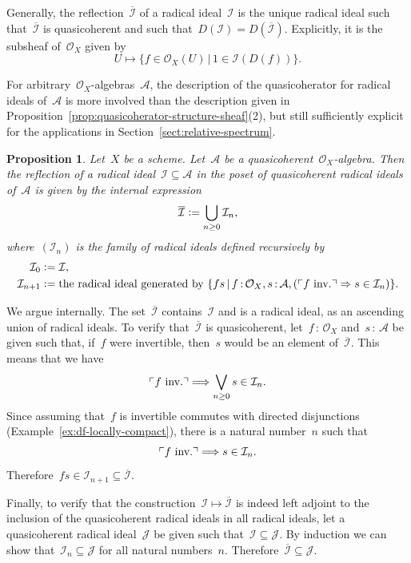 \documentclass[10pt,reqno,a4paper]{amsbook}
\makeatletter
\theoremstyle{definition}
\theoremstyle{plain}
\newtheorem{prop}[defn]{Proposition}
\theoremstyle{remark}
\newcommand{\A}{\mathcal{A}}
\renewcommand{\O}{\mathcal{O}}
\newcommand{\I}{\mathcal{I}}
\newcommand{\J}{\mathcal{J}}
\newcommand{\?}{\,{:}\,}
\renewcommand{\_}{\mathpunct{.}\,}
\newcommand{\speak}[1]{\ulcorner\text{\textnormal{#1}}\urcorner}
\newcommand{\inv}{inv.\@}
\newcommand{\defeq}{\vcentcolon=}
\renewenvironment{proof}[1][\proofname]{\par
  \pushQED{\qed}%
  \normalfont \topsep6\p@\@plus6\p@\relax
  \trivlist
  \item[\hskip\labelsep
        \itshape
    #1\@addpunct{.}]\ignorespaces
}{%
  \popQED\endtrivlist\@endpefalse
}
\makeatother
\begin{document}
Generally, the reflection~$\overline{\I}$ of a radical ideal~$\I$ is the unique
radical ideal such that~$\overline{\I}$ is quasicoherent and such that~$D(\I) =
D(\overline{\I})$. Explicitly, it is the subsheaf of~$\O_X$ given by
\[ U \longmapsto \{ f \in \O_X(U) \,|\, 1 \in \I(D(f)) \}. \]

For arbitrary~$\O_X$-algebras~$\A$, the description of the quasicoherator for
radical ideals of~$\A$ is more involved than the description given in
Proposition~\ref{prop:quasicoherator-structure-sheaf}(2), but still
sufficiently explicit for the applications in
Section~\ref{sect:relative-spectrum}.

\begin{prop}\label{prop:quasicoherator-arbitrary-algebra}
Let~$X$ be a scheme. Let~$\A$ be a quasicoherent~$\O_X$-algebra.
Then the reflection of a radical ideal~$\I \subseteq \A$ in the poset of
quasicoherent radical ideals of~$\A$ is given by the internal expression
\[ \overline{\I} \defeq \bigcup_{n \geq 0} \I_n, \]
where~$(\I_n)$ is the family of radical ideals defined recursively by
\begin{align*}
  \I_0 &\defeq \I, \\
  \I_{n+1} &\defeq \textnormal{the radical ideal generated by
  $\{ fs \,|\, f\?\O_X, s\?\A, (\speak{$f$ \inv} \Rightarrow s \in \I_n) \}$}.
\end{align*}
\end{prop}
\begin{proof}We argue internally. The set~$\overline{\I}$ contains~$\I$ and is
a radical ideal, as an ascending union of radical ideals. To verify
that~$\overline{\I}$ is quasicoherent, let~$f\?\O_X$ and~$s\?\A$ be given such
that, if~$f$ were invertible, then~$s$ would be an element of~$\overline{\I}$.
This means that we have
\[ \speak{$f$ \inv} \Longrightarrow \bigvee_{n \geq 0} s \in \I_n. \]
Since assuming that~$f$ is invertible commutes with directed disjunctions
(Example~\ref{ex:df-locally-compact}), there is a natural number~$n$ such that
\[ \speak{$f$ \inv} \Longrightarrow s \in \I_n. \]
Therefore~$fs \in \I_{n+1} \subseteq \overline{\I}$.

Finally, to verify that the construction~$\I \mapsto \overline{\I}$ is indeed
left adjoint to the inclusion of the quasicoherent radical ideals in all
radical ideals, let a quasicoherent radical ideal~$\J$ be given such that~$\I
\subseteq \J$. By induction we can show that~$\I_n \subseteq \J$ for all
natural numbers~$n$. Therefore~$\overline{\I} \subseteq \J$.
\end{proof}
\end{document}
